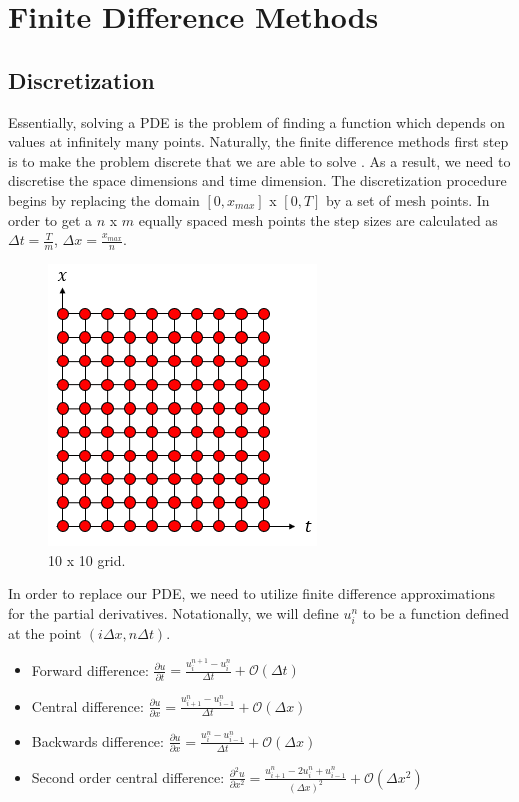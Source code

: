 \documentclass[12pt, oneside]{book}
\theoremstyle{plain}
\theoremstyle{definition}
\begin{document}
\section{Finite Difference Methods}
\subsection{Discretization}
Essentially, solving a PDE is the problem of finding a function which depends on values at infinitely many points. Naturally, the finite difference methods first step is to make the problem discrete that we are able to solve \cite{jwthomas}. As a result, we need to discretise the space dimensions and time dimension. The discretization procedure begins by replacing the domain $[0, x_{max}]$ x  $[0, T]$  by a set of mesh points. In order to get a $n$ x $m$ equally spaced mesh points the step sizes are calculated as $ \Delta t = \frac{T}{m}$, $\Delta x = \frac{x_{max}}{n}$.

\begin{figure}[!htb]
    \centering
        \includegraphics[scale=0.8]{Discretize.png}
    \caption{10 x 10 grid.}
\end{figure}
In order to replace our PDE, we need to utilize finite difference approximations for the partial derivatives. Notationally, we will define $u^n_i$ to be a function defined at the point $(i \Delta x, n \Delta t) $.

\begin{itemize}
        \item Forward difference: $ \frac{\partial u}{\partial t} = \frac{u^{n+1}_i - u^n_i}{\Delta t} + \mathcal{O}( \Delta t) $
        \item Central difference: $ \frac{\partial u}{\partial x} = \frac{u^n_{i+1} - u^n_{i-1}}{\Delta t}   + \mathcal{O}( \Delta x) $
        \item Backwards difference: $ \frac{\partial u}{\partial x} = \frac{u^{n}_i - u^n_{i - 1}}{\Delta t}  + \mathcal{O}( \Delta x) $
        \item Second order central difference: $ \frac{\partial^2 u}{\partial x^2} = \frac{u^n_{i+1}- 2u^n_i + u^n_{i-1}}{(\Delta x)^2}  + \mathcal{O}( \Delta x^2) $
\end{itemize}
\end{document}
